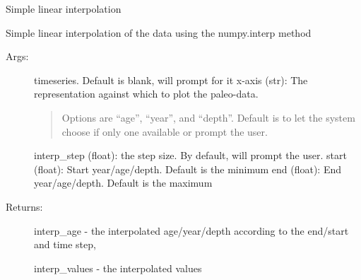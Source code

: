 \documentclass[letterpaper,10pt,english]{sphinxmanual}
\begin{document}
\begin{fulllineitems}
\label{\detokenize{Main:pyleoclim.interpTs}}
Simple linear interpolation

Simple linear interpolation of the data using the numpy.interp method
\begin{description}
\item[{Args:}] \leavevmode
timeseries. Default is blank, will prompt for it
x-axis (str): The representation against which to plot the paleo-data.
\begin{quote}

Options are “age”, “year”, and “depth”. Default is to let the
system choose if only one available or prompt the user.
\end{quote}

interp\_step (float): the step size. By default, will prompt the user.
start (float): Start year/age/depth. Default is the minimum
end (float): End year/age/depth. Default is the maximum

\item[{Returns:}] \leavevmode
interp\_age - the interpolated age/year/depth according to the end/start
and time step,

interp\_values - the interpolated values

\end{description}

\end{fulllineitems}

\end{document}
